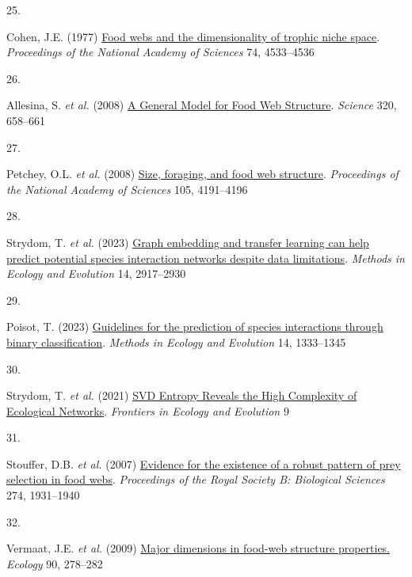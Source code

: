 \documentclass[
]{article}
\newlength{\cslhangindent}
\newlength{\csllabelwidth}
\newenvironment{CSLReferences}[2] %
 {\begin{list}{}{%
  \setlength{\itemindent}{0pt}
  \setlength{\leftmargin}{0pt}
  \setlength{\parsep}{0pt}
  \ifodd #1
   \setlength{\leftmargin}{\cslhangindent}
   \setlength{\itemindent}{-1\cslhangindent}
  \fi
  \setlength{\itemsep}{#2\baselineskip}}}
 {\end{list}}
\newcommand{\CSLLeftMargin}[1]{\parbox[t]{\csllabelwidth}{\strut#1\strut}}
\newcommand{\CSLRightInline}[1]{\parbox[t]{\linewidth - \csllabelwidth}{\strut#1\strut}}
\begin{document}
\begin{CSLReferences}{0}{0}
\CSLLeftMargin{25. }%
\CSLRightInline{Cohen, J.E. (1977)
\href{https://doi.org/10.1073/pnas.74.10.4533}{Food webs and the
dimensionality of trophic niche space}. \emph{Proceedings of the
National Academy of Sciences} 74, 4533--4536}

\CSLLeftMargin{26. }%
\CSLRightInline{Allesina, S. \emph{et al.} (2008)
\href{https://doi.org/10.1126/science.1156269}{A {General Model} for
{Food Web Structure}}. \emph{Science} 320, 658--661}

\CSLLeftMargin{27. }%
\CSLRightInline{Petchey, O.L. \emph{et al.} (2008)
\href{https://doi.org/10.1073/pnas.0710672105}{Size, foraging, and food
web structure}. \emph{Proceedings of the National Academy of Sciences}
105, 4191--4196}

\CSLLeftMargin{28. }%
\CSLRightInline{Strydom, T. \emph{et al.} (2023)
\href{https://doi.org/10.1111/2041-210X.14228}{Graph embedding and
transfer learning can help predict potential species interaction
networks despite data limitations}. \emph{Methods in Ecology and
Evolution} 14, 2917--2930}

\CSLLeftMargin{29. }%
\CSLRightInline{Poisot, T. (2023)
\href{https://doi.org/10.1111/2041-210X.14071}{Guidelines for the
prediction of species interactions through binary classification}.
\emph{Methods in Ecology and Evolution} 14, 1333--1345}

\CSLLeftMargin{30. }%
\CSLRightInline{Strydom, T. \emph{et al.} (2021)
\href{https://doi.org/10.3389/fevo.2021.623141}{{SVD Entropy Reveals}
the {High Complexity} of {Ecological Networks}}. \emph{Frontiers in
Ecology and Evolution} 9}

\CSLLeftMargin{31. }%
\CSLRightInline{Stouffer, D.B. \emph{et al.} (2007)
\href{https://doi.org/10.1098/rspb.2007.0571}{Evidence for the existence
of a robust pattern of prey selection in food webs}. \emph{Proceedings
of the Royal Society B: Biological Sciences} 274, 1931--1940}

\CSLLeftMargin{32. }%
\CSLRightInline{Vermaat, J.E. \emph{et al.} (2009)
\href{https://www.ncbi.nlm.nih.gov/pubmed/19294932}{Major dimensions in
food-web structure properties.} \emph{Ecology} 90, 278--282}


\end{CSLReferences}
\end{document}
